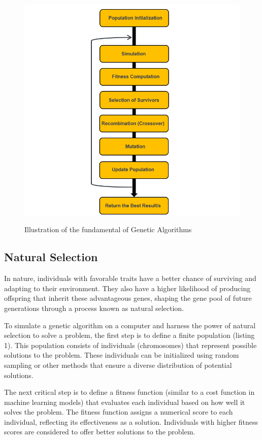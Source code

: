\documentclass[12pt]{article}
\begin{document}
\begin{figure}[H]
\centering
\includegraphics[scale=.7]{Picture11}\\
\caption{Illustration of the fundamental of Genetic Algorithms}
\end{figure}



\subsection{Natural Selection}

In nature, individuals with favorable traits have a better chance of surviving and adapting to their environment. They also have a higher likelihood of producing offspring that inherit these advantageous genes, shaping the gene pool of future generations through a process known as natural selection.

To simulate a genetic algorithm on a computer and harness the power of natural selection to solve a problem, the first step is to define a finite population (listing 1). This population consists of individuals (chromosomes) that represent possible solutions to the problem. These individuals can be initialized using random sampling or other methods that ensure a diverse distribution of potential solutions.

The next critical step is to define a fitness function (similar to a cost function in machine learning models) that evaluates each individual based on how well it solves the problem. The fitness function assigns a numerical score to each individual, reflecting its effectiveness as a solution. Individuals with higher fitness scores are considered to offer better solutions to the problem.
\end{document}
